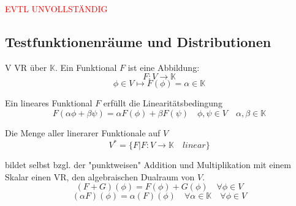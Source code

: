 











\textcolor{red}{EVTL UNVOLLSTÄNDIG}
\subsection{Testfunktionenräume und Distributionen}

\begin{Def}
    V VR über $\mathbb{K}$. Ein Funktional $F$ ist eine Abbildung:
    $$F: V \rightarrow \mathbb{K}$$
    $$ \phi \in V \mapsto F(\phi) = \alpha \in \mathbb{K}$$

    Ein lineares Funktional $F$ erfüllt die Linearitätsbedingung
    $$F(\alpha \phi + \beta \psi) = \alpha F(\phi) + \beta F(\psi) \quad \phi , \psi \in V \quad \alpha, \beta \in \mathbb{K} $$

    Die Menge aller linerarer Funktionale auf $V$
    $$V^\ast =  \{ F | F:V \rightarrow \mathbb{K} \quad linear \} $$

    bildet selbst bzgl. der "punktweisen" Addition und Multiplikation
    mit einem Skalar einen VR, den algebraischen Dualraum von $V$.
    $$(F+G)(\phi) = F(\phi) + G(\phi) \quad \forall \phi \in V $$
    $$(\alpha F)(\phi) = \alpha (F)(\phi)  \quad \forall \alpha \in \mathbb{K} \quad \forall \phi \in V $$
\end{Def}

